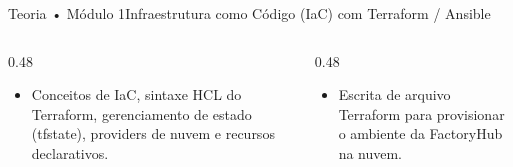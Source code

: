 \begin{senaiframe}{Teoria • Módulo 1}{Infraestrutura como Código (IaC) com Terraform / Ansible}
  \begin{columns}[t]
    \begin{column}{0.48\textwidth}
      \begin{tcolorbox}[senaibluecard, title={Fundamentos Teóricos}]
        \begin{itemize}
          \item Conceitos de IaC, sintaxe HCL do Terraform, gerenciamento de estado (tfstate), providers de nuvem e recursos declarativos.
        \end{itemize}
      \end{tcolorbox}
    \end{column}
    \begin{column}{0.48\textwidth}
      \begin{tcolorbox}[senaigreencard, title={Prática \& Laboratório}]
        \begin{itemize}
          \item Escrita de arquivo Terraform para provisionar o ambiente da FactoryHub na nuvem.
        \end{itemize}
      \end{tcolorbox}
    \end{column}
  \end{columns}
\end{senaiframe}
